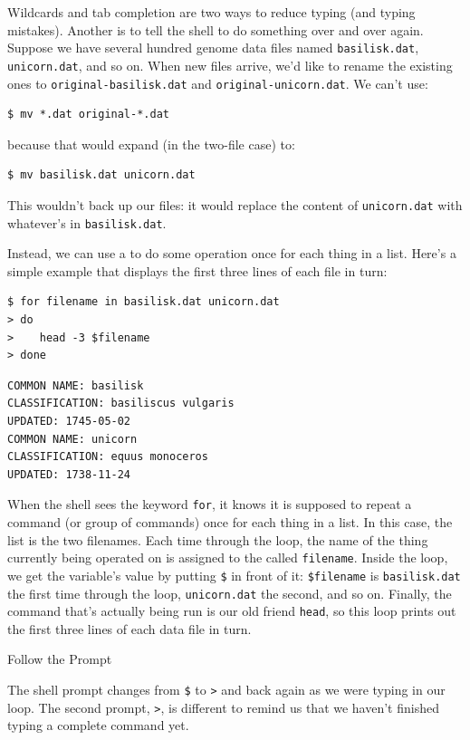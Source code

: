 \documentclass{book}
\begin{document}
Wildcards and tab completion are two ways to reduce typing (and typing
mistakes). Another is to tell the shell to do something over and over
again. Suppose we have several hundred genome data files named
\texttt{basilisk.dat}, \texttt{unicorn.dat}, and so on. When new files
arrive, we'd like to rename the existing ones to
\texttt{original-basilisk.dat} and \texttt{original-unicorn.dat}. We
can't use:

\begin{verbatim}
$ mv *.dat original-*.dat
\end{verbatim}

because that would expand (in the two-file case) to:

\begin{verbatim}
$ mv basilisk.dat unicorn.dat
\end{verbatim}

This wouldn't back up our files: it would replace the content of
\texttt{unicorn.dat} with whatever's in \texttt{basilisk.dat}.

Instead, we can use a  to do some operation
once for each thing in a list. Here's a simple example that displays the
first three lines of each file in turn:

\begin{verbatim}
$ for filename in basilisk.dat unicorn.dat
> do
>    head -3 $filename
> done
\end{verbatim}

\begin{verbatim}
COMMON NAME: basilisk
CLASSIFICATION: basiliscus vulgaris
UPDATED: 1745-05-02
COMMON NAME: unicorn
CLASSIFICATION: equus monoceros
UPDATED: 1738-11-24
\end{verbatim}

When the shell sees the keyword \texttt{for}, it knows it is supposed to
repeat a command (or group of commands) once for each thing in a list.
In this case, the list is the two filenames. Each time through the loop,
the name of the thing currently being operated on is assigned to the
 called \texttt{filename}. Inside the
loop, we get the variable's value by putting \texttt{\$} in front of it:
\texttt{\$filename} is \texttt{basilisk.dat} the first time through the
loop, \texttt{unicorn.dat} the second, and so on. Finally, the command
that's actually being run is our old friend \texttt{head}, so this loop
prints out the first three lines of each data file in turn.

\begin{swcbox}{Follow the Prompt}

The shell prompt changes from \texttt{\$} to \texttt{\textgreater{}} and
back again as we were typing in our loop. The second prompt,
\texttt{\textgreater{}}, is different to remind us that we haven't
finished typing a complete command yet.

\end{swcbox}
\end{document}
